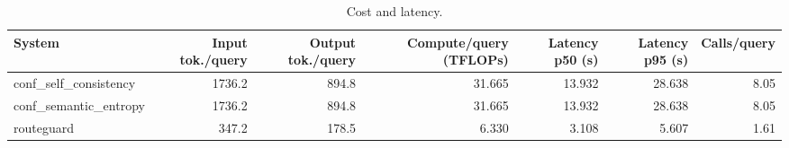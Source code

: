 \begin{table}[t]
\centering
\small
\caption{Cost and latency.}
\label{tab:efficiency}
\begin{tabular}{lrrrrrr}
\toprule
System & Input tok./query & Output tok./query & Compute/query (TFLOPs) & Latency p50 (s) & Latency p95 (s) & Calls/query \\
\midrule
conf\_self\_consistency & 1736.2 & 894.8 & 31.665 & 13.932 & 28.638 & 8.05 \\
conf\_semantic\_entropy & 1736.2 & 894.8 & 31.665 & 13.932 & 28.638 & 8.05 \\
routeguard & 347.2 & 178.5 & 6.330 & 3.108 & 5.607 & 1.61 \\
\bottomrule
\end{tabular}
\end{table}
